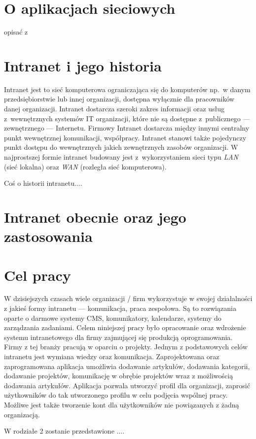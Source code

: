 \section{O aplikacjach sieciowych}
opisać z \cite{strack15}
\section{Intranet i jego historia}

Intranet jest to sieć komputerowa ograniczająca się do komputerów np.\ w danym przedsiębiorstwie lub innej organizacji, dostępna wyłącznie dla
pracowników danej organizacji. Intranet dostarcza szeroki zakres informacji oraz usług z~wewnętrznych systemów IT organizacji, które nie są
dostępne z~publicznego --- zewnętrznego --- Internetu. Firmowy Intranet dostarcza między innymi centralny punkt wewnętrznej komunikacji, współpracy. 
Intranet stanowi także pojedynczy punkt dostępu do wewnętrznych jakich zewnętrznych zasobów organizacji. W najprostszej formie intranet budowany
jest z~wykorzystaniem sieci typu \emph{LAN} (sieć lokalna) oraz \emph{WAN} (rozległa sieć komputerowa)\cite{intranetWiki}.

Coś o historii intranetu....

\section{Intranet obecnie oraz jego zastosowania}


\section{Cel pracy}

W dzisiejszych czasach wiele organizacji / firm wykorzystuje w swojej działalności z jakieś formy intranetu --- komunikacja, praca zespołowa. 
Są to rozwiązania oparte o darmowe systemy CMS, komunikatory, kalendarze, systemy do zarządzania zadaniami. Celem niniejszej pracy było opracowanie
oraz wdrożenie systemu intranetowego dla firmy zajmującej się produkcją oprogramowania. Firmy z tej branży pracują w oparciu o projekty. Jednym z
podstawowych celów intranetu jest wymiana wiedzy oraz komunikacja. Zaprojektowana oraz zaprogramowana aplikacja umożliwia dodawanie artykułów,
dodawania kategorii, dodawanie projektów, komunikację w obrębie projektów wraz z możliwością dodawania artykułów. Aplikacja pozwala utworzyć profil 
dla organizacji, zaprosić użytkowników do tak utworzonego profilu w celu podjęcia wspólnej pracy. Możliwe jest także tworzenie kont dla użytkowników
nie powiązanych z żadną organizacją.

W rodziałe 2 zostanie przedstawione ....

